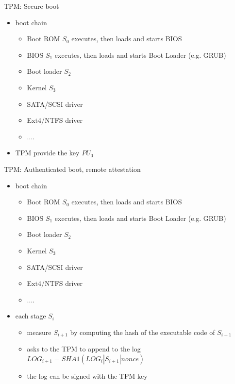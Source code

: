 \documentclass{beamer}
\begin{document}
\begin{frame}{TPM: Secure boot}
  \begin{itemize}
  \item boot chain
    \begin{itemize}
      \item Boot ROM $S_0$ executes, then loads and starts BIOS
      \item BIOS $S_1$ executes, then loads and starts Boot Loader
        (e.g. GRUB)
      \item Boot loader $S_2$
      \item Kernel $S_3$
      \item SATA/SCSI driver
      \item Ext4/NTFS driver
      \item ....
    \end{itemize}
   \item TPM provide the key $PU_0$
  \end{itemize}
\end{frame}

\begin{frame}{TPM: Authenticated boot, remote attestation}
  \begin{itemize}
  \item boot chain
    \begin{itemize}
      \item Boot ROM $S_0$ executes, then loads and starts BIOS
      \item BIOS $S_1$ executes, then loads and starts Boot Loader
        (e.g. GRUB)
      \item Boot loader $S_2$
      \item Kernel $S_3$
      \item SATA/SCSI driver
      \item Ext4/NTFS driver
      \item ....
    \end{itemize}
   \item each stage $S_i$
     \begin{itemize}
       \item measure $S_{i+1}$ by computing the hash of the executable
         code of $S_{i+1}$
       \item asks to the TPM to append to the log $LOG_{i+1} =
         SHA1(LOG_{i} | S_{i+1} | nonce)$
       \item the log can be signed with the TPM key
     \end{itemize}
  \end{itemize}
\end{frame}
\end{document}

